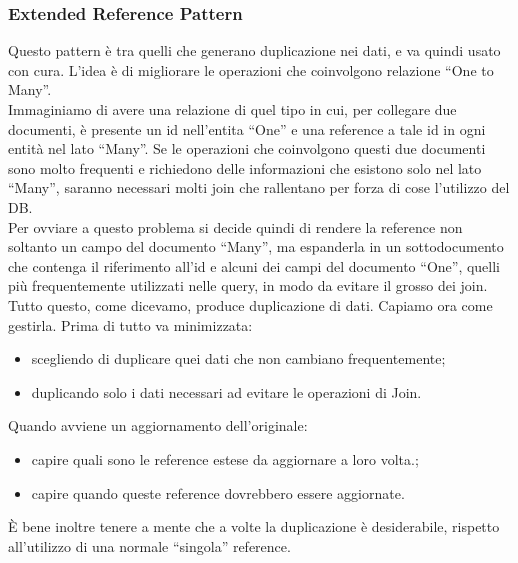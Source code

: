 \subsubsection{Extended Reference Pattern}
Questo pattern è tra quelli che generano duplicazione nei dati, e va quindi usato con cura.
L'idea è di migliorare le operazioni che coinvolgono relazione ``One to Many''.\\
Immaginiamo di avere una relazione di quel tipo in cui, per collegare due documenti, è presente un id nell'entita ``One'' e una reference a tale id in ogni entità nel lato ``Many''. Se le operazioni che coinvolgono questi due documenti sono molto frequenti e richiedono delle informazioni che esistono solo nel lato ``Many'', saranno necessari molti join che rallentano per forza di cose l'utilizzo del DB.\\
Per ovviare a questo problema si decide quindi di rendere la reference non soltanto un campo del documento ``Many'', ma espanderla in un sottodocumento che contenga il riferimento all'id e alcuni dei campi del documento ``One'', quelli più frequentemente utilizzati nelle query, in modo da evitare il grosso dei join.\\
Tutto questo, come dicevamo, produce duplicazione di dati. Capiamo ora come gestirla.
Prima di tutto va minimizzata:
\begin{itemize}
    \item scegliendo di duplicare quei dati che non cambiano frequentemente;
    \item duplicando solo i dati necessari ad evitare le operazioni di Join.
\end{itemize}
\noindent Quando avviene un aggiornamento dell'originale:
\begin{itemize}
    \item capire quali sono le reference estese da aggiornare a loro volta.;
    \item capire quando queste reference dovrebbero essere aggiornate.
\end{itemize}
\noindent È bene inoltre tenere a mente che a volte la duplicazione è desiderabile, rispetto all'utilizzo di una normale ``singola'' reference.

